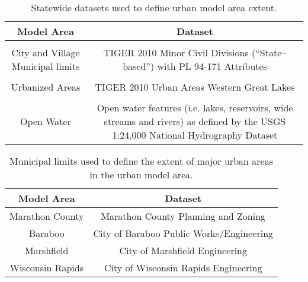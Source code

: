 \begin{table}
\begin{center}
	\caption{Statewide datasets used to define urban model area extent.}
	\begin{tabular}{c c}
	\hline
		Model Area	      &	Dataset \\
	\hline	\hline\\[0.25]
		City and Village Municipal limits        &	\parbox[l]{0.6\textwidth}{TIGER 2010 Minor Civil Divisions (``State--based'') with PL 94-171 Attributes}		\\
		 & \\
		Urbanized Areas	  &	TIGER 2010 Urban Areas Western Great Lakes	 	\\
		& \\
		Open Water  &	\parbox[l]{0.6\textwidth}{Open water features (i.e. lakes, reservoirs, wide streams and rivers) as defined by the USGS 1:24,000 National Hydrography Dataset} \\
		\hline
	\end{tabular}
\label{tab:urban_model_boundary_data}
\end{center}
\end{table}

\begin{table}
\begin{center}
	\caption{Municipal limits used to define the extent of major urban areas in the urban model area.}
	\begin{tabular}{c c}
	\hline
		Model Area	      &	Dataset \\
	\hline	\hline
		Marathon County        &	Marathon County Planning and Zoning \\
		Baraboo	  &	City of Baraboo Public Works/Engineering	 	\\
		Marshfield  &	City of Marshfield Engineering \\
		Wisconsin Rapids & City of Wisconsin Rapids Engineering\\
		\hline
	\end{tabular}
\label{tab:specific_urban_areas_limits}
\end{center}
\end{table}

